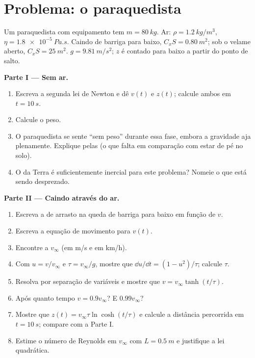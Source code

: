 \section{Problema: o paraquedista}

\begin{problem}
\label{pb:b1:newton-dynamics:1}
Um paraquedista com equipamento tem  $m = \qty{80}{kg}$. Ar:
$\rho = \qty{1.2}{kg/m^3}$, $\eta = \qty{1.8e-5}{Pa.s}$. Caindo de barriga
para baixo, $C_xS = \qty{0.80}{m^2}$; sob o velame aberto, $C_xS =
\qty{25}{m^2}$. $g = \qty{9.81}{m/s^2}$; $z$ é contado para baixo a partir
do ponto de salto.

\medskip
\noindent\textbf{Parte I --- Sem ar.}
\begin{enumerate}
  \item Escreva a segunda lei de Newton e dê $v(t)$ e $z(t)$; calcule
        ambos em $t = \qty{10}{s}$.
  \item Calcule o peso.
  \item O paraquedista se sente ``sem peso'' durante essa fase, embora
        a gravidade aja plenamente. Explique pelas  (o que falta
        em comparação com estar de pé no solo).
  \item O  da Terra é suficientemente inercial para este problema? Nomeie o que
        está sendo desprezado.
\end{enumerate}

\medskip
\noindent\textbf{Parte II --- Caindo através do ar.}
\begin{enumerate}[resume]
  \item Escreva a  de arrasto na queda de barriga para baixo em função de $v$.
  \item Escreva a equação de movimento para $v(t)$.
  \item Encontre a  $v_\infty$ (em \unit{m/s} e em
        \unit{km/h}).
  \item Com $u = v/v_\infty$ e $\tau = v_\infty/g$, mostre que
        $\dd u/\dd t = (1 - u^2)/\tau$; calcule $\tau$.
  \item Resolva por separação de variáveis e mostre que
        $v = v_\infty\tanh(t/\tau)$.
  \item Após quanto tempo $v = 0.9v_\infty$? E $0.99v_\infty$?
  \item Mostre que $z(t) = v_\infty\tau\ln\cosh(t/\tau)$ e calcule a
        distância percorrida em $t = \qty{10}{s}$; compare com a Parte I.
  \item Estime o número de Reynolds em $v_\infty$ com $L = \qty{0.5}{m}$
        e justifique a lei quadrática.
\end{enumerate}


\end{problem}
